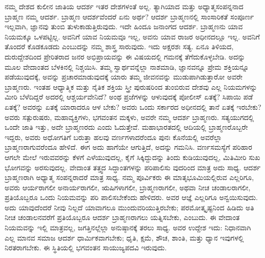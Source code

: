 ನಮ್ಮ ದೇಶದ ಕುಲೀನ ಜಾತಿಯ ಆದರ್ಶ ಇತರ ದೇಶಗಳಂತೆ ಅಲ್ಲ. ತ್ಯಾಗಿಯಾದ ಮತ್ತು ಅಧ್ಯಾತ್ಮಸಂಪನ್ನನಾದ ಬ್ರಾಹ್ಮಣ ನಮ್ಮ ಆದರ್ಶ. ಬ್ರಾಹ್ಮಣ ಆದರ್ಶವೆಂದರೆ ಏನು ಅರ್ಥ? ಆದರ್ಶ ಬ್ರಾಹ್ಮಣನಲ್ಲಿ ಸಾಂಸಾರಿಕತೆ ಸಂಪೂರ್ಣ ಇಲ್ಲವಾಗಿ, ಜ್ಞಾನವು ತುಂಬಿ ತುಳುಕಾಡುತ್ತಿರುವುದು. ಇದೇ ಹಿಂದೂ ಜನಾಂಗದ ಆದರ್ಶ. ಬ್ರಾಹ್ಮಣನು ಯಾವ ನಿಯಮಕ್ಕೂ ಒಳಪಟ್ಟಿಲ್ಲ. ಅವನಿಗೆ ಯಾವ ನಿಯಮವೂ ಇಲ್ಲ, ಅವನು ಯಾವ ರಾಜರ ಅಧೀನದಲ್ಲೂ ಇಲ್ಲ. ಅವನಿಗೆ ತೊಂದರೆ ಕೊಡಕೂಡದು ಎಂಬುದನ್ನು ನಮ್ಮ ಶಾಸ್ತ್ರ ಸಾರುವುದು. ಇದು ಅಕ್ಷರಶಃ ಸತ್ಯ. ಏನೂ ತಿಳಿಯದ, ದುರುದ್ದೇಶದಿಂದ ಪ್ರೇರಿತರಾದ ಜನರ ಅಭಿಪ್ರಾಯವನ್ನು ಈ ವಿಷಯದಲ್ಲಿ ಗಮನಕ್ಕೆ ತೆಗೆದುಕೊಳ್ಳಬೇಡಿ. ಅದನ್ನು ಮೂಲ ವೇದಾಂತದ ಬೆಳಕಿನಲ್ಲಿ ನಿಶ್ಚಯಿಸಿ. ತಮ್ಮ ಸ್ವಾರ್ಥವನ್ನೆಲ್ಲಾ ನಾಶಮಾಡಿ, ಜ್ಞಾನವನ್ನೂ ಪ್ರೇಮ ಶಕ್ತಿಯನ್ನೂ ಪಡೆಯುವುದಕ್ಕೆ, ಅವನ್ನು ಪ್ರಚಾರಮಾಡುವುದಕ್ಕೆ ಯಾರು ತಮ್ಮ ಜೀವನವನ್ನು ಮುಡುಪಾಗಿಡುತ್ತಾರೋ ಅವರೇ ಬ್ರಾಹ್ಮಣರು. ಇಂತಹ ಆಧ್ಯಾತ್ಮಿಕ ಮತ್ತು ನೈತಿಕ ಶಕ್ತಿಯ ಸ್ತ್ರೀ ಪುರುಷರಿಂದ ತುಂಬಿರುವ ದೇಶವು ಎಲ್ಲ ನಿಯಮಗಳನ್ನು ಮೀರಿ ಬೆಳೆದಿದ್ದರೆ ಅದರಲ್ಲಿ ಆಶ್ಚರ್ಯವೇನಿದೆ? ಅಂಥ ಪ್ರಜೆಗಳನ್ನು ಆಳುವುದಕ್ಕೆ ಪೋಲೀಸ್​ ಏತಕ್ಕೆ? ಸಿಪಾಯಿ ಪಡೆ ಏತಕ್ಕೆ? ಅವರನ್ನು ಏತಕ್ಕೆ ಯಾರಾದರೂ ಆಳ ಬೇಕು? ಅವರು ಒಂದು ಸರ್ಕಾರದ ಅಧೀನದಲ್ಲಿ ತಾನೆ ಏತಕ್ಕೆ ಇರಬೇಕು? ಅವರು ಸತ್ಪುರುಷರು, ಮಹಾವ್ಯಕ್ತಿಗಳು, ಭಗವಂತನ ಮಕ್ಕಳು, ಅವರೇ ನಮ್ಮ ಆದರ್ಶ ಬ್ರಾಹ್ಮಣರು. ಸತ್ಯಯುಗದಲ್ಲಿ ಒಂದೇ ಜಾತಿ ಇತ್ತು, ಅದೇ ಬ್ರಾಹ್ಮಣರದು ಎಂದು ಓದುತ್ತೇವೆ. ಮಹಾಭಾರತದಲ್ಲಿ ಆದಿಯಲ್ಲಿ ಬ್ರಾಹ್ಮಣರೊಬ್ಬರೇ ಇದ್ದರು, ಅವರು ಅಧೋಗತಿಗೆ ಬರುತ್ತಾ ಹಲವು ವರ್ಣಗಳಾದರೆಂದೂ ಪುನಃ ಕೊನೆಯಲ್ಲಿ ಅವರೆಲ್ಲಾ ಬ್ರಾಹ್ಮಣರಾಗುವರೆಂದೂ ಹೇಳಿದೆ. ಈಗ ಅದು ಹಾಗೆಯೇ ಆಗುತ್ತಿದೆ, ಅದನ್ನು ಗಮನಿಸಿ. ವರ್ಣಸಮಸ್ಯೆಗೆ ಪರಿಹಾರ ಆಗಲೇ ಮೇಲೆ ಇರುವವರನ್ನು ಕೆಳಗೆ ಎಳೆಯುವುದಲ್ಲ, ಕೈಗೆ ಸಿಕ್ಕಿದ್ದುದನ್ನು ತಿಂದು ಕುಡಿಯುವುದಲ್ಲ, ಮಿತಿಮೀರಿ ಸುಖ ಭೋಗವನ್ನು ಅರಸುವುದಲ್ಲ. ವೇದಾಂತ ತತ್ತ್ವದ ಸಿದ್ಧಾಂತಗಳನ್ನು ಪರಿಪಾಲಿಸು ವುದರಿಂದ ಮಾತ್ರ ಅದು ಸಾಧ್ಯ. ಆದರ್ಶ ಬ್ರಾಹ್ಮಣರಾಗಿ ಅಧ್ಯಾತ್ಮ ಸಂಪನ್ನರಾದರೆ ಮಾತ್ರ ಸಾಧ್ಯ. ನಮ್ಮ ಪೂರ್ವಿಕರು ಈ ಮಾತೃಭೂಮಿಯಲ್ಲಿರುವ ಎಲ್ಲರಿಗೂ, ಅವರು ಆರ್ಯರಾಗಲೀ ಅನಾರ್ಯರಾಗಲೀ, ಋಷಿಗಳಾಗಲೀ, ಬ್ರಾಹ್ಮಣರಾಗಲೀ, ಅಥವಾ ನೀಚ ಚಂಡಾಲರಾಗಲೀ, ಪ್ರತಿಯೊಬ್ಬರೂ ಒಂದು ನಿಯಮವನ್ನು ಪರಿ ಪಾಲಿಸಬೇಕೆಂದು ಹೇಳಿದರು. ಅವರ ಆಜ್ಞೆ ಎಲ್ಲರಿಗೂ ಅನ್ವಯಿಸುವುದು. ಅದು ಯಾವುದೆಂದರೆ ನೀವು ನಿಲ್ಲದೆ ಯಾವಾಗಲೂ ಮುಂದುವರಿಯುತ್ತಿರಬೇಕು; ಪರಮೋತ್ಕೃಷ್ಟನಿಂದ ಹಿಡಿದು ಅತಿ ನೀಚ ಚಂಡಾಲನವರೆಗೆ ಪ್ರತಿಯೊಬ್ಬರೂ ಆದರ್ಶ ಬ್ರಾಹ್ಮಣರಾಗಲು ಯತ್ನಿಸಬೇಕು, ಎಂಬುದು. ಈ ವೇದಾಂತ ನಿಯಮವನ್ನು ಇಲ್ಲಿ ಮಾತ್ರವಲ್ಲ, ಜಗತ್ತಿನಲ್ಲೆಲ್ಲಾ ಅನುಷ್ಠಾನಕ್ಕೆ ತರಲು ಸಾಧ್ಯ. ಅವರ ಉದ್ದೇಶ ಇದು: ನಿಧಾನವಾಗಿ ಎಲ್ಲ ಮಾನವ ಸಮಾಜ ಆದರ್ಶ ಧಾರ್ಮಿಕವಾಗಬೇಕು; ಧೃತಿ, ಕ್ಷಮೆ, ಶೌಚ, ಶಾಂತಿ, ಮತ್ತು ಧ್ಯಾನ ಇವುಗಳಲ್ಲಿ ನಿರತರಾಗಬೇಕು. ಈ ಸ್ಥಿತಿಯಲ್ಲಿ ಭಗವಂತನ ಸಾಯುಜ್ಯಪದವಿ ಇರುವುದು. 

